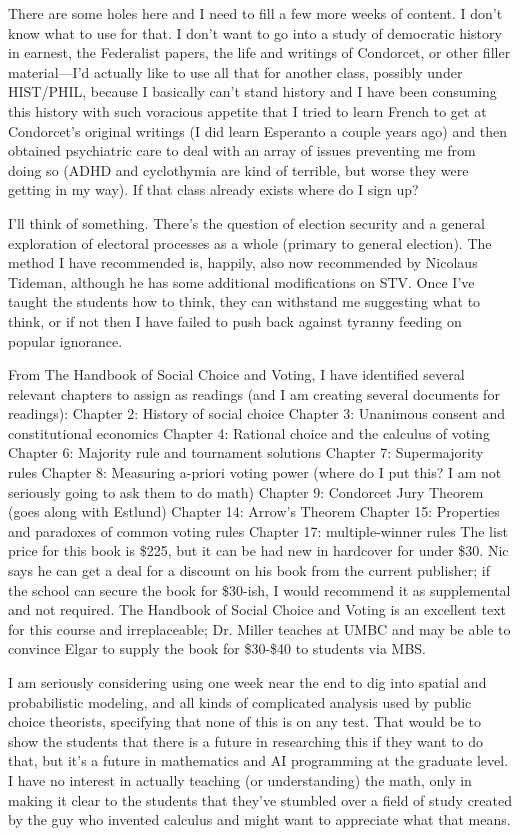 There are some holes here and I need to fill a few more weeks of content.  I don't know what to use for that.  I don't want to go into a study of democratic history in earnest, the Federalist papers, the life and writings of Condorcet, or other filler material—I'd actually like to use all that for another class, possibly under HIST/PHIL, because I basically can't stand history and I have been consuming this history with such voracious appetite that I tried to learn French to get at Condorcet's original writings (I did learn Esperanto a couple years ago) and then obtained psychiatric care to deal with an array of issues preventing me from doing so (ADHD and cyclothymia are kind of terrible, but worse they were getting in my way).  If that class already exists where do I sign up?

I'll think of something.  There's the question of election security and a general exploration of electoral processes as a whole (primary to general election).  The method I have recommended is, happily, also now recommended by Nicolaus Tideman, although he has some additional modifications on STV.  Once I've taught the students how to think, they can withstand me suggesting what to think, or if not then I have failed to push back against tyranny feeding on popular ignorance.

From The Handbook of Social Choice and Voting, I have identified several relevant chapters to assign as readings (and I am creating several documents for readings):
Chapter 2:  History of social choice
Chapter 3:  Unanimous consent and constitutional economics
Chapter 4:  Rational choice and the calculus of voting
Chapter 6:  Majority rule and tournament solutions
Chapter 7:  Supermajority rules
Chapter 8:  Measuring a-priori voting power (where do I put this?  I am not seriously going to ask them to do math)
Chapter 9:  Condorcet Jury Theorem (goes along with Estlund)
Chapter 14:  Arrow's Theorem
Chapter 15:  Properties and paradoxes of common voting rules
Chapter 17:  multiple-winner rules
The list price for this book is \$225, but it can be had new in hardcover for under \$30.  Nic says he can get a deal for a discount on his book from the current publisher; if the school can secure the book for \$30-ish, I would recommend it as supplemental and not required.  The Handbook of Social Choice and Voting is an excellent text for this course and irreplaceable; Dr. Miller teaches at UMBC and may be able to convince Elgar to supply the book for \$30-\$40 to students via MBS.

I am seriously considering using one week near the end to dig into spatial and probabilistic modeling, and all kinds of complicated analysis used by public choice theorists, specifying that none of this is on any test.  That would be to show the students that there is a future in researching this if they want to do that, but it's a future in mathematics and AI programming at the graduate level.  I have no interest in actually teaching (or understanding) the math, only in making it clear to the students that they've stumbled over a field of study created by the guy who invented calculus and might want to appreciate what that means.

